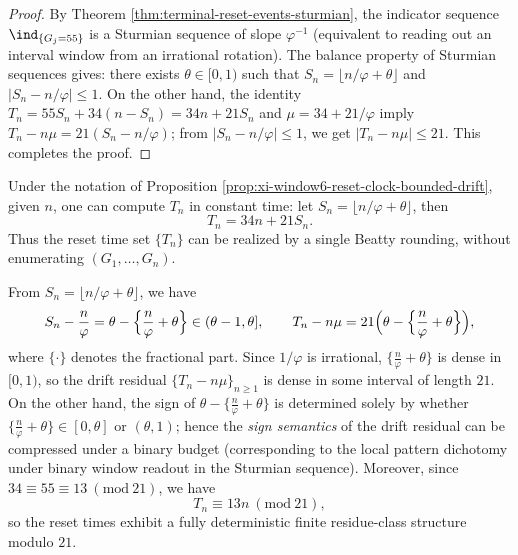 \begin{proof}
By Theorem \ref{thm:terminal-reset-events-sturmian}, the indicator sequence \(\ind_{\{G_j=55\}}\) is a Sturmian sequence of slope \(\varphi^{-1}\) (equivalent to reading out an interval window from an irrational rotation).
The balance property of Sturmian sequences gives: there exists \(\theta\in[0,1)\) such that
\(
S_n=\lfloor n/\varphi+\theta\rfloor
\)
and \(|S_n-n/\varphi|\le 1\).
On the other hand, the identity \(T_n=55S_n+34(n-S_n)=34n+21S_n\) and \(\mu=34+21/\varphi\) imply
\(
T_n-n\mu=21(S_n-n/\varphi)
\);
from \(|S_n-n/\varphi|\le 1\), we get \(|T_n-n\mu|\le 21\). This completes the proof.
\end{proof}

\begin{corollary}\label{cor:xi-window6-reset-clock-O1-computable}
Under the notation of Proposition \ref{prop:xi-window6-reset-clock-bounded-drift}, given \(n\), one can compute \(T_n\) in constant time:
let \(S_n=\lfloor n/\varphi+\theta\rfloor\), then
\[
T_n=34n+21S_n.
\]
Thus the reset time set \(\{T_n\}\) can be realized by a single Beatty rounding, without enumerating \((G_1,\dots,G_n)\).
\end{corollary}

\begin{remark}\label{rem:xi-window6-reset-clock-residual-rotation-congruence}
From \(S_n=\lfloor n/\varphi+\theta\rfloor\), we have
\[
S_n-\frac{n}{\varphi}=\theta-\Bigl\{\frac{n}{\varphi}+\theta\Bigr\}\in(\theta-1,\theta],
\qquad
T_n-n\mu=21\Bigl(\theta-\Bigl\{\frac{n}{\varphi}+\theta\Bigr\}\Bigr),
\]
where \(\{\cdot\}\) denotes the fractional part.
Since \(1/\varphi\) is irrational, \(\{\frac{n}{\varphi}+\theta\}\) is dense in \([0,1)\), so the drift residual \(\{T_n-n\mu\}_{n\ge 1}\) is dense in some interval of length \(21\).
On the other hand, the sign of \(\theta-\{\frac{n}{\varphi}+\theta\}\) is determined solely by whether
\(\{\frac{n}{\varphi}+\theta\}\in[0,\theta]\) or \((\theta,1)\);
hence the \emph{sign semantics} of the drift residual can be compressed under a binary budget (corresponding to the local pattern dichotomy under binary window readout in the Sturmian sequence).
Moreover, since \(34\equiv 55\equiv 13\ (\mathrm{mod}\ 21)\), we have
\[
T_n\equiv 13n\ (\mathrm{mod}\ 21),
\]
so the reset times exhibit a fully deterministic finite residue-class structure modulo \(21\).
\end{remark}

